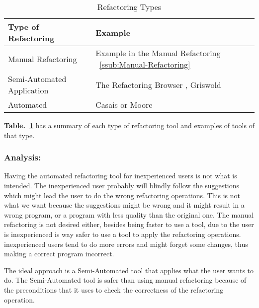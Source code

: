 

\begin{table}[h]
\caption{Refactoring Types}
\label{tab-Refactoring-Types}
\begin{tabular}{|l|l|}
\hline
\textbf{Type of Refactoring} & \textbf{Example}                                                                             \\ \hline
Manual Refactoring           & Example in the Manual Refactoring ~\ref{ssub:Manual-Refactoring}      \\ \hline
Semi-Automated Application   & The Refactoring Browser \cite{roberts1997refactoring}, Griswold \cite{griswold1993automated} \\ \hline
Automated                    & Casais \cite{casais1994automatic} or Moore \cite{moore1996automatic}             \\ \hline
\end{tabular}
\end{table}



{\bf Table.~\ref{tab-Refactoring-Types}} has a summary of each type of refactoring tool and examples of tools of that type.

\subsubsection{Analysis:}
Having the automated refactoring tool for inexperienced users is not what is intended.
The inexperienced user probably will blindly follow the suggestions which might lead the user to do the wrong refactoring operations.
This is not what we want because the suggestions might be wrong and it might result in a wrong program, or a program with less quality than the original one.
The manual refactoring is not desired either, besides being faster to use a tool, due to the user is inexperienced is way safer to use a tool to apply the refactoring operations.
inexperienced users tend to do more errors and might forget some changes, thus making a correct program incorrect.

The ideal approach is a Semi-Automated tool that applies what the user wants to do.
The Semi-Automated tool is safer than using manual refactoring because of the preconditions that it uses to check the correctness of the refactoring operation.
